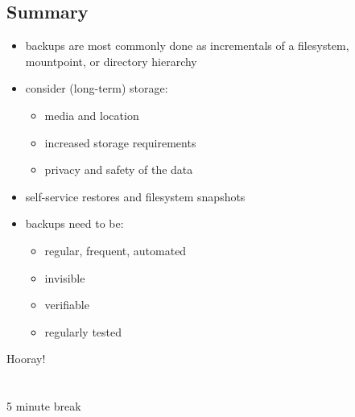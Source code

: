 \documentclass[xga]{xdvislides}
\begin{document}
\subsection{Summary}
\begin{itemize}
	\item backups are most commonly done as incrementals
		of a filesystem, mountpoint, or directory hierarchy
	\item consider (long-term) storage:
		\begin{itemize}
			\item media and location
			\item increased storage requirements
			\item privacy and safety of the data
		\end{itemize}
	\item self-service restores and filesystem snapshots
	\item backups need to be:
		\begin{itemize}
			\item regular, frequent, automated
			\item invisible
			\item verifiable
			\item regularly tested
		\end{itemize}
\end{itemize}

\newpage
\vspace*{\fill}
\begin{center}
	\Hugesize
		Hooray!\\ [1em]
	\hspace*{5mm}
	\blueline\\
	\hspace*{5mm}\\
		5 minute break
\end{center}
\vspace*{\fill}
\end{document}
